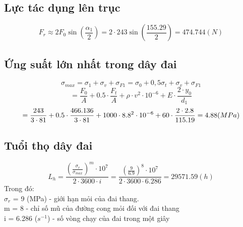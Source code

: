 \subsection{Lực tác dụng lên trục}
\[
    F_r \approx 2F_0\sin(\frac{\alpha_1}{2}) = 2\cdot 243\sin(\frac{155.29}{2}) = 474.744 (N) 
\]
\subsection{Ứng suất lớn nhất trong dây đai}
\[
    \sigma_{max} = \sigma_1 + \sigma_v + \sigma_{F1} = \sigma_0 + 0,5\sigma_t + \sigma_v + \sigma_{F1} 
\]
\[
    = \frac{F_0}{A} + 0.5\cdot \frac{F_t}{A} + \rho \cdot v^2\cdot 10^{-6} + E\cdot \frac{2\cdot y_0}{d_1} 
\]
\[
    = \frac{243}{3\cdot 81} + 0.5\cdot \frac{466.136}{3\cdot 81} + 1000\cdot 8.8^2\cdot 10^{-6} + 60\cdot \frac{2\cdot 2.8}{115.19} = 4.88 (MPa) \\
\]
\subsection{Tuổi thọ dây đai}
\[
    L_h = \frac{(\frac{\sigma_r}{\sigma_{max}})^m\cdot 10^7}{2\cdot 3600\cdot i} = \frac{(\frac{9}{6.9})^8\cdot10^7}{2\cdot3600\cdot6.286} = 29571.59 (h)
\]
Trong đó:\\
$\sigma_r$ = 9 (MPa) - giới hạn mỏi của đai thang.\\
m = 8 - chỉ số mũ của đường cong mỏi đối với đai thang\\
i = 6.286 ($s^{-1}$) - số vòng chạy của đai trong một giây\\
\cleardoublepage
